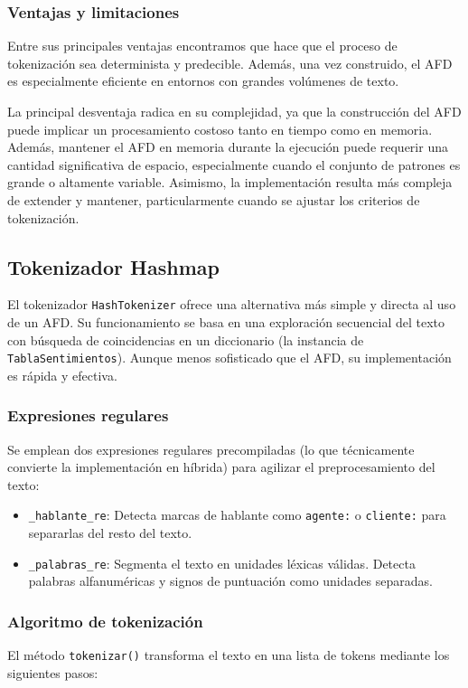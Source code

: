 \subsubsection{Ventajas y limitaciones}
Entre sus principales ventajas encontramos que hace que el proceso de tokenización sea
determinista y predecible. Además, una vez construido, el AFD es especialmente eficiente en
entornos con grandes volúmenes de texto.

La principal desventaja radica en su complejidad, ya que la construcción del AFD puede implicar
un procesamiento costoso tanto en tiempo como en memoria. Además, mantener el AFD en memoria
durante la ejecución puede requerir una cantidad significativa de espacio, especialmente cuando
el conjunto de patrones es grande o altamente variable. Asimismo, la implementación resulta más
compleja de extender y mantener, particularmente cuando se ajustar los criterios de
tokenización.

\subsection{Tokenizador Hashmap}
El tokenizador \texttt{HashTokenizer} ofrece una alternativa más simple y directa al uso de un
AFD. Su funcionamiento se basa en una exploración secuencial del texto con búsqueda de
coincidencias en un diccionario (la instancia de \texttt{TablaSentimientos}). Aunque menos
sofisticado que el AFD, su implementación es rápida y efectiva.

\subsubsection{Expresiones regulares}
Se emplean dos expresiones regulares precompiladas (lo que técnicamente convierte la
implementación en híbrida) para agilizar el preprocesamiento del texto:

\begin{itemize}
	\item \texttt{\_hablante\_re}: Detecta marcas de hablante como \texttt{agente:} o
	      \texttt{cliente:} para separarlas del resto del texto.

	\item \texttt{\_palabras\_re}: Segmenta el texto en unidades léxicas válidas. Detecta
	      palabras alfanuméricas y signos de puntuación como unidades separadas.
\end{itemize}

\subsubsection{Algoritmo de tokenización}
El método \texttt{tokenizar()} transforma el texto en una lista de tokens mediante los
siguientes pasos:

